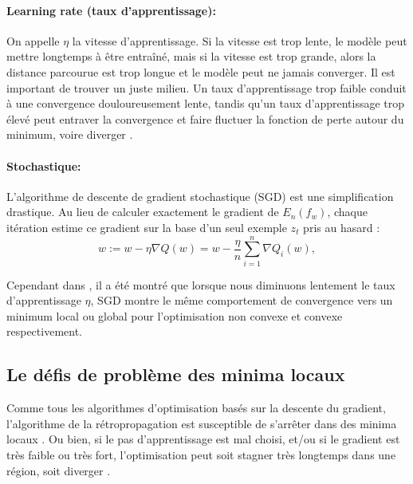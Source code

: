 	\paragraph*{Learning rate (taux d’apprentissage):}On appelle $\eta$ la vitesse d’apprentissage.
	Si la vitesse est trop lente, le modèle peut mettre longtemps à être entraîné, mais si la vitesse est trop grande, alors la distance parcourue est trop longue et le modèle peut ne jamais converger. Il est important de trouver un juste milieu. 
	Un taux d'apprentissage trop faible conduit à une convergence douloureusement lente, tandis qu'un taux d'apprentissage trop élevé peut entraver la convergence et faire fluctuer la fonction de perte autour du minimum, voire diverger \cite{ruder2016overview}.
	
	
	\paragraph{Stochastique:}
	
	L'algorithme de descente de gradient stochastique (SGD) est une simplification drastique. Au lieu de calculer exactement le gradient de $E_n (f_w )$, chaque itération estime ce gradient sur la base d'un seul exemple $z_t$ pris au hasard \cite{bottou2012stochastic} :
	$$
	{\displaystyle w:=w-\eta \nabla Q(w)=w-{\frac {\eta }{n}}\sum _{i=1}^{n}\nabla Q_{i}(w),}
	$$
	
	Cependant dans \cite{ruder2016overview}, il a été montré que lorsque nous diminuons lentement le taux d'apprentissage $\eta $, SGD montre le même comportement de convergence vers un minimum local ou global pour l'optimisation non convexe et convexe respectivement.
	
	
	

	\subsection{Le défis de problème des minima locaux} 
	
	Comme tous les algorithmes d'optimisation basés sur la descente du gradient, l'algorithme de la rétropropagation est susceptible de s'arrêter dans des minima locaux \cite{bosman2020visualising}. Ou bien, si le pas d'apprentissage est mal choisi, et/ou si le gradient est très faible ou très fort, l'optimisation peut soit stagner très longtemps dans une région, soit diverger \cite{antoine2018apprentissage,ml2008python}.
	
